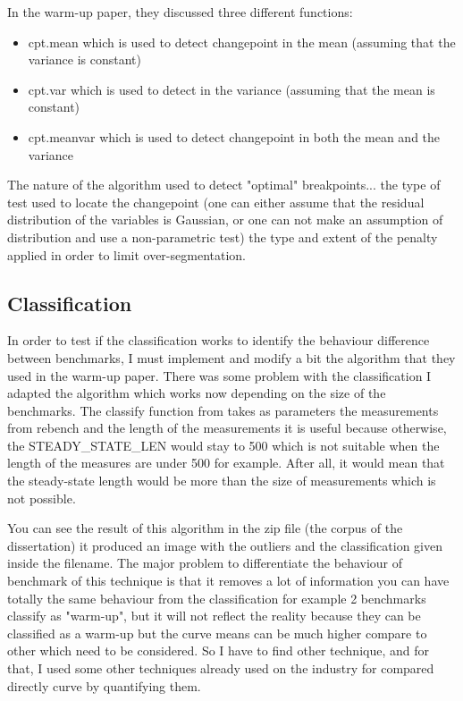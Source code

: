 \documentclass{article}
\begin{document}
In the warm-up paper, they discussed three different functions:

\begin{itemize}
    \item cpt.mean which is used to detect changepoint in the mean (assuming that the variance is constant)
    \item cpt.var which is used to detect  in the variance (assuming that the mean is constant)
    \item cpt.meanvar which is used to detect changepoint in both the mean and the variance
\end{itemize}

The nature of the algorithm used to detect "optimal" breakpoints...
the type of test used to locate the changepoint (one can either assume that the residual distribution of the variables is Gaussian, or one can not make an assumption of distribution and use a non-parametric test)
the type and extent of the penalty applied in order to limit over-segmentation.

\subsection{Classification}

In order to test if the classification works to identify the behaviour difference between benchmarks, I must implement and modify a bit the algorithm that they used in the warm-up paper.
There was some problem with the classification I adapted the algorithm which works now depending on the size of the benchmarks.
The classify function from \citep{barrett2017virtual} takes as parameters the measurements from rebench and the length of the measurements it is useful because otherwise, the STEADY\_STATE\_LEN would stay to 500 which is not suitable when the length of the measures are under 500 for example. After all, it would mean that the steady-state length would be more than the size of measurements which is not possible.


You can see the result of this algorithm in the zip file (the corpus of the dissertation) it produced an image with the outliers and the classification given inside the filename.
The major problem to differentiate the behaviour of benchmark of this technique is that it removes a lot of information you can have totally the same behaviour from the classification for example 2 benchmarks classify as "warm-up", but it will not reflect the reality because they can be classified as a warm-up but the curve means can be much higher compare to other which need to be considered. So I have to find other technique, and for that, I used some other techniques already used on the industry for compared directly curve by quantifying them.
\end{document}
